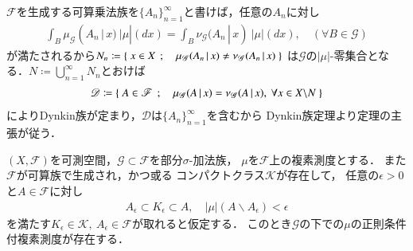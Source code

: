 	\begin{prf}
		$\mathscr{F}$を生成する可算乗法族を$\{A_n\}_{n=1}^\infty$と書けば，任意の$A_n$に対し
		\begin{align}
			\int_{B} \mu_{\mathscr{G}}(A_n\, |\, x)\ |\mu|(dx)
			= \int_{B} \nu_{\mathscr{G}}(A_n\, |\, x)\ |\mu|(dx),
			\quad (\forall B \in \mathscr{G})
		\end{align}
		が満たされるから$N_n \coloneqq \left\{\ x \in X\ \, ; \quad \mu_{\mathscr{G}}(A_n\, |\, x) \neq \nu_{\mathscr{G}}(A_n\, |\, x)\ \right\}$
		は$\mathscr{G}$の$|\mu|$-零集合となる．$N \coloneqq \bigcup_{n=1}^\infty N_n$とおけば
		\begin{align}
			\mathscr{D} \coloneqq \Set{A \in \mathscr{F}}{\mu_{\mathscr{G}}(A\, |\, x) = \nu_{\mathscr{G}}(A\, |\, x),\ 
			\forall x \in X \backslash N}
		\end{align}
		によりDynkin族が定まり，$\mathscr{D}$は$\{A_n\}_{n=1}^\infty$を含むから
		Dynkin族定理より定理の主張が従う．
		\QED
	\end{prf}
	
	\begin{screen}
		\begin{thm}[正則条件付複素測度の存在]
			$(X,\mathscr{F})$を可測空間，$\mathscr{G} \subset \mathscr{F}$を部分$\sigma$-加法族，
			$\mu$を$\mathscr{F}$上の複素測度とする．
			また$\mathscr{F}$が可算族で生成され，かつ或る
			コンパクトクラス$\mathcal{K}$が存在して，
			任意の$\epsilon > 0$と$A \in \mathscr{F}$に対し
			\begin{align}
				A_\epsilon \subset K_\epsilon \subset A,\quad |\mu|(A \backslash A_\epsilon) < \epsilon
			\end{align}
			を満たす$K_\epsilon \in \mathcal{K},\ A_\epsilon \in \mathscr{F}$が取れると仮定する．
			このとき$\mathscr{G}$の下での$\mu$の正則条件付複素測度が存在する．
		\end{thm}
	\end{screen}